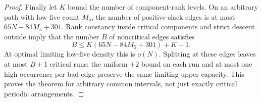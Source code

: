 \documentclass[10pt,a4paper]{amsart}
\begin{document}
\begin{proof}
Finally let $K$ bound the number of component-rank levels. On an
arbitrary path with low-five count $M_5$, the number of positive-slack
edges is at most $65N-84M_5+301$. Rank constancy inside critical
components and strict descent outside imply that the number $B$ of
noncritical edges satisfies
\[
 B\le K(65N-84M_5+301)+K-1.
\]
At optimal limiting low-five density this is $o(N)$. Splitting at these
edges leaves at most $B+1$ critical runs; the uniform $+2$ bound on each
run and at most one high occurrence per bad edge preserve the same
limiting upper capacity. This proves the theorem for arbitrary common
intervals, not just exactly critical periodic arrangements.
\end{proof}
\end{document}
